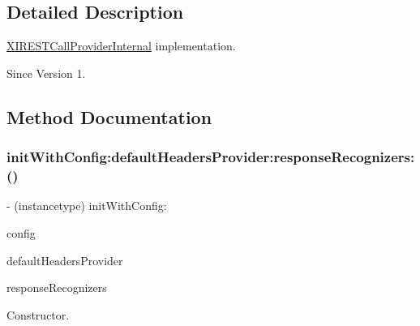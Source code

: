 \subsection{Detailed Description}
\hyperlink{interface_x_i_r_e_s_t_call_provider_internal}{X\+I\+R\+E\+S\+T\+Call\+Provider\+Internal} implementation. 

\begin{DoxySince}{Since}
Version 1. 
\end{DoxySince}


\subsection{Method Documentation}
\hypertarget{interface_x_i_r_e_s_t_call_provider_internal_ab7b1e2c7114d170d1efbb086da61984a}{}\label{interface_x_i_r_e_s_t_call_provider_internal_ab7b1e2c7114d170d1efbb086da61984a} 
\subsubsection{\texorpdfstring{init\+With\+Config\+:default\+Headers\+Provider\+:response\+Recognizers\+:()}{initWithConfig:defaultHeadersProvider:responseRecognizers:()}}
{\footnotesize\ttfamily -\/ (instancetype) init\+With\+Config\+: \begin{DoxyParamCaption}\item[{(\hyperlink{class_x_i_sdk_config}{X\+I\+Sdk\+Config} $\ast$)}]{config }\item[{defaultHeadersProvider:(\hyperlink{interface_x_i_r_e_s_t_default_headers_provider}{X\+I\+R\+E\+S\+T\+Default\+Headers\+Provider} $\ast$)}]{default\+Headers\+Provider }\item[{responseRecognizers:(N\+S\+Array $\ast$)}]{response\+Recognizers }\end{DoxyParamCaption}}



Constructor. 


